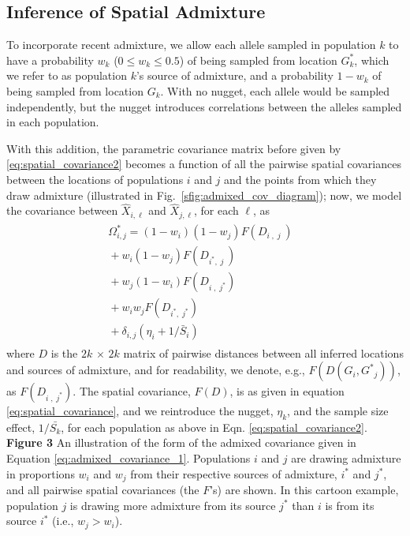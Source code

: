 \documentclass[10pt,letterpaper]{article}
\newcommand{\kadmixsource}[1]{{$G^{*}_{#1}$}}
\newcommand{\identifyadmixsource}[1]{{#1^{*}}}
\begin{document}
\subsection*{Inference of Spatial Admixture}

To incorporate recent admixture, 
we allow each allele sampled in population $k$ to have a probability $w_k$ ($0 \leq w_k \leq 0.5$) of being sampled from location \kadmixsource{k},
which we refer to as population $k$'s source of admixture,
and a probability $1-w_k$ of being sampled from location $G_k$.
With no nugget, each allele would be sampled independently, but the nugget introduces correlations between the alleles sampled in each population.

With this addition, the parametric covariance matrix before given by \eqref{eq:spatial_covariance2}
becomes a function of all the pairwise spatial covariances between the locations of populations $i$ and $j$ and the points from which they draw admixture 
(illustrated in Fig.\ \ref{sfig:admixed_cov_diagram});
now, we model the covariance between $\hat X_{i,\ell}$ and $\hat X_{j,\ell}$, for each $\ell$, as
\begin{align}
\label{eq:admixed_covariance_1}\begin{split}
\identifyadmixsource{\Omega_{i,j}} = 
  (1-w_i)(1-w_j) F(D_{i\;,\;j\;}) &\\
  {} + w_i(1-w_j) F(D_{\identifyadmixsource{i},\;j\;})    &\\
  {} + w_j(1-w_i) F(D_{i\;,\;\identifyadmixsource{j}})    &\\
  {} + w_i w_j F(D_{\identifyadmixsource{i},\;\identifyadmixsource{j}})    &\\
  {} + \delta_{i,j} (\eta_i + 1 / \bar{S}_i) &
\end{split}
\end{align}
where $D$ is the $2k \, \times \, 2k$ matrix of pairwise distances between all inferred locations and sources of admixture, 
and for readability, we denote, e.g., $F(D(G_i,\identifyadmixsource{G}_j))$, as $F(D_{i\;,\;\identifyadmixsource{j}})$.
The spatial covariance, $F(D)$, is as given in equation \eqref{eq:spatial_covariance}, and we reintroduce the nugget, $\eta_k$, and the sample size effect, $1/\bar{S_k}$, for each population as above in Eqn. \eqref{eq:spatial_covariance2}.
%
\newline\newline
{\bf{Figure 3}} An illustration of the form of the admixed covariance given in Equation \eqref{eq:admixed_covariance_1}.  Populations $i$ and $j$ are drawing admixture in proportions $w_i$ and $w_j$ from their respective sources of admixture, $\identifyadmixsource{i}$ and $\identifyadmixsource{j}$, and all pairwise spatial covariances (the $F$'s) are shown.  In this cartoon example, population $j$ is drawing more admixture from its source $\identifyadmixsource{j}$ than $i$ is from its source $\identifyadmixsource{i}$ (i.e., $w_j > w_i$).
\newline\newline
\end{document}
